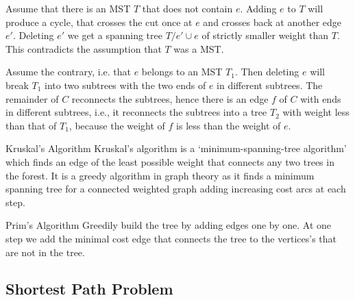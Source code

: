 
\begin{prooof}
    Assume that there is an MST $T$ that does not contain $e$. Adding $e$ to
    $T$ will produce a cycle, that crosses the cut once at $e$ and crosses
    back at another edge $e'$. Deleting $e'$ we get a spanning tree
    $T/{e'}\cup{e}$ of strictly smaller weight than $T$. This contradicts the
    assumption that $T$ was a MST. 
\end{prooof}


\begin{prooof}
    Assume the contrary, i.e. that $e$ belongs to an MST $T_1$. Then deleting
    $e$ will break $T_1$ into two subtrees with the two ends of $e$ in
    different subtrees. The remainder of $C$ reconnects the subtrees, hence
    there is an edge $f$ of $C$ with ends in different subtrees, i.e., it
    reconnects the subtrees into a tree $T_2$ with weight less than that of
    $T_1$, because the weight of $f$ is less than the weight of $e$.
\end{prooof}



{Kruskal's Algorithm}{
    Kruskal's algorithm is a `minimum-spanning-tree algorithm' which
    finds an edge of the least possible weight that connects any two trees in the
    forest. It is a greedy algorithm in graph theory as it finds a minimum
    spanning tree for a connected weighted graph adding increasing cost arcs at
    each step.
}



{Prim's Algorithm}{
    Greedily build the tree by adding edges one by one. At one step we
    add the minimal cost edge that connects the tree to the vertices's that are
    not in the tree.
}


\subsection{Shortest Path Problem}



